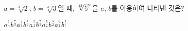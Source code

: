 $a=\sqrt[3]{2}$, $b=\sqrt[4]{3}$일 때, $\sqrt[12]{6^7}$을 $a$, $b$를 이용하여 나타낸 것은?
\begin{choices32}{$a^{\frac{7}{4}}b^{\frac{7}{3}}$}{$a^{\frac{7}{4}}b^{\frac{7}{2}}$}{$a^{\frac{5}{2}}b^{\frac{7}{3}}$}{$a^{\frac{5}{2}}b^{\frac{5}{2}}$}{$a^{\frac{7}{2}}b^{\frac{7}{3}}$}\end{choices32}
